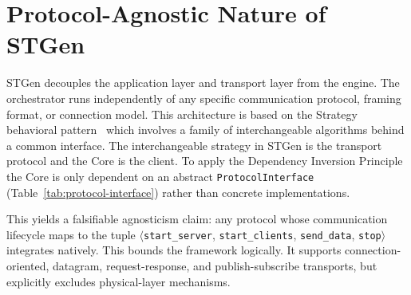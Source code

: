 \documentclass[jsan,article,submit,moreauthors,pdftex]{Definitions/mdpi}
\begin{document}
\section{Protocol-Agnostic Nature of STGen}
\label{sec:protocol-agnosticism}


STGen decouples the application layer and transport layer from the engine. The orchestrator runs independently of any specific communication protocol, framing format, or connection model. This architecture is based on the Strategy behavioral pattern~\cite{gamma1994design} which involves a family of interchangeable algorithms behind a common interface. The interchangeable strategy in STGen is the transport protocol and the Core is the client. To apply the Dependency Inversion Principle~\cite{martin1996dependency} the Core is only dependent on an abstract \texttt{ProtocolInterface} (Table~\ref{tab:protocol-interface}) rather than concrete implementations. 

This yields a falsifiable agnosticism claim: any protocol whose communication lifecycle maps to the tuple $\langle$\texttt{start\_server}, \texttt{start\_clients}, \texttt{send\_data}, \texttt{stop}$\rangle$ integrates natively. This bounds the framework logically. It supports connection-oriented, datagram, request-response, and publish-subscribe transports, but explicitly excludes physical-layer mechanisms.
\end{document}
